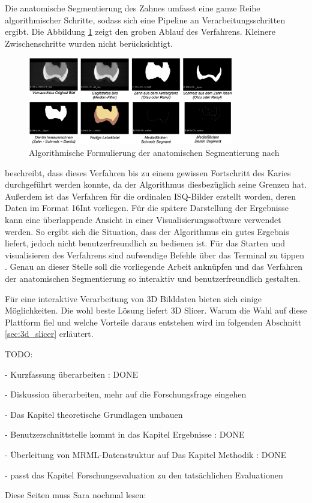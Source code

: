 Die anatomische Segmentierung des Zahnes umfasst eine ganze Reihe algorithmischer
Schritte, sodass sich eine Pipeline an Verarbeitungsschritten ergibt. Die Abbildung
\ref{fig:anatomische_segmentierung} zeigt den groben Ablauf des Verfahrens.
Kleinere Zwischenschritte wurden nicht berücksichtigt.

\begin{figure}[h]
	\centering
	\includegraphics[width=0.8\textwidth]{img/anatomischeSegmentierung.png}
	\caption{Algorithmische Formulierung der anatomischen Segmentierung nach
	\citet{hoffmann2020}}
	\label{fig:anatomische_segmentierung}
\end{figure}

\citet[S.~55]{hoffmann2020} beschreibt, dass dieses Verfahren bis zu einem gewissen
Fortschritt des Karies durchgeführt werden konnte, da der Algorithmus
diesbezüglich seine Grenzen hat. Außerdem ist das Verfahren für die ordinalen \ac{ISQ}-Bilder
erstellt worden, deren Daten im Format \ac{16Int} vorliegen. Für die spätere Darstellung
der Ergebnisse kann eine überlappende Ansicht in einer Visualisierungssoftware verwendet
werden. So ergibt sich die Situation, dass der Algorithmus ein gutes Ergebnis liefert,
jedoch nicht benutzerfreundlich zu bedienen ist. Für das Starten und visualisieren
des Verfahrens sind aufwendige Befehle über das Terminal zu tippen \citep[vgl.][S.~53]{hoffmann2020}.
Genau an dieser Stelle soll die vorliegende Arbeit anknüpfen und das Verfahren der
anatomischen Segmentierung so interaktiv und benutzerfreundlich gestalten.

Für eine interaktive Verarbeitung von 3D Bilddaten bieten sich einige Möglichkeiten.
Die wohl beste Lösung liefert 3D Slicer. Warum die Wahl auf diese Plattform fiel
und welche Vorteile daraus entstehen wird im folgenden Abschnitt \ref{sec:3d_slicer}
erläutert.

TODO:

- Kurzfassung überarbeiten : DONE

- Diskussion überarbeiten, mehr auf die Forschungsfrage eingehen

- Das Kapitel theoretische Grundlagen umbauen

- Benutzerschnittstelle kommt in das Kapitel Ergebnisse : DONE

- Überleitung von MRML-Datenstruktur auf Das Kapitel Methodik : DONE

- passt das Kapitel Forschungsevaluation zu den tatsächlichen Evaluationen

Diese Seiten muss Sara nochmal lesen: